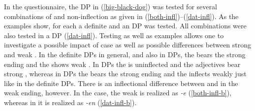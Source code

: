 \documentclass[output=paper,colorlinks,citecolor=brown]{langscibook}
\begin{document}
In the questionnaire, the DP in (\ref{big-black-dog}) was tested for several combinations of  and non-inflection as given in (\ref{both-infl})--(\ref{dat-infl}). As the examples show, for each  a definite and an   DP was tested. All combinations were also tested in a  DP (\ref{dat-infl}). Testing  as well as  examples allows one to investigate a possible impact of case as well as possible differences between strong and weak . In the definite DPs in general, and also in   DPs, the  bears the strong ending and the  shows weak . In   DPs the  is uninflected and the adjectives bear strong , whereas in   DPs the  bears the strong ending and the  inflects weakly just like in the definite DPs. There is an inflectional difference between  and  in the weak ending, however. In the  case, the weak  is realized as \textit{-e} (\ref{both-infl-b}), whereas in  it is realized as \textit{-en} (\ref{dat-infl-b}).
\end{document}
